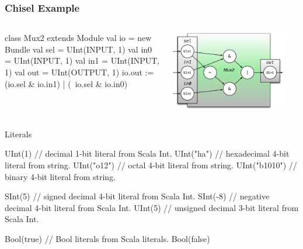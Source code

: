 \documentclass[xcolor=pdflatex,dvipsnames,table]{beamer}
\begin{document}
\begin{frame}[fragile]
\frametitle{Chisel Example}
\begin{columns}


\begin{footnotesize}
\begin{scala}
class Mux2 extends Module {
  val io = new Bundle{
    val sel = UInt(INPUT, 1)
    val in0 = UInt(INPUT, 1)
    val in1 = UInt(INPUT, 1)
    val out = UInt(OUTPUT, 1)
  }
  io.out := (io.sel & io.in1) | 
            (~io.sel & io.in0)
}
\end{scala}
\end{footnotesize}


\begin{center}
\includegraphics[width=0.9\textwidth]{figs/mux2-component.pdf} 
\end{center}

\end{columns}
\end{frame}


\begin{frame}[fragile]{Literals}
\begin{scala}
UInt(1)       // decimal 1-bit literal from Scala Int. 
UInt("ha")    // hexadecimal 4-bit literal from string.
UInt("o12")   // octal 4-bit literal from string. 
UInt("b1010") // binary 4-bit literal from string.

SInt(5)       // signed decimal 4-bit literal from Scala Int.
SInt(-8)      // negative decimal 4-bit literal from Scala Int.
UInt(5)       // unsigned decimal 3-bit literal from Scala Int.

Bool(true)    // Bool literals from Scala literals.
Bool(false)
\end{scala}
\end{frame}
 
\end{document}
